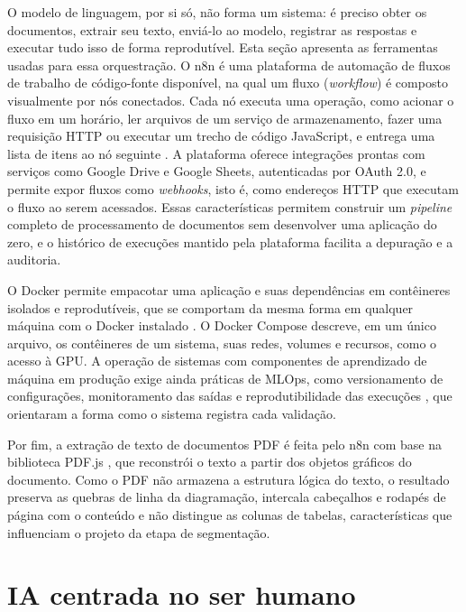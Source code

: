 O modelo de linguagem, por si só, não forma um sistema: é preciso obter os documentos, extrair seu texto, enviá-lo ao modelo, registrar as respostas e executar tudo isso de forma reprodutível. Esta seção apresenta as ferramentas usadas para essa orquestração. O n8n é uma plataforma de automação de fluxos de trabalho de código-fonte disponível, na qual um fluxo (\textit{workflow}) é composto visualmente por nós conectados. Cada nó executa uma operação, como acionar o fluxo em um horário, ler arquivos de um serviço de armazenamento, fazer uma requisição HTTP ou executar um trecho de código JavaScript, e entrega uma lista de itens ao nó seguinte \cite{n8nDocs}. A plataforma oferece integrações prontas com serviços como Google Drive e Google Sheets, autenticadas por OAuth 2.0, e permite expor fluxos como \textit{webhooks}, isto é, como endereços HTTP que executam o fluxo ao serem acessados. Essas características permitem construir um \textit{pipeline} completo de processamento de documentos sem desenvolver uma aplicação do zero, e o histórico de execuções mantido pela plataforma facilita a depuração e a auditoria.

O Docker permite empacotar uma aplicação e suas dependências em contêineres isolados e reprodutíveis, que se comportam da mesma forma em qualquer máquina com o Docker instalado \cite{Merkel2014}. O Docker Compose descreve, em um único arquivo, os contêineres de um sistema, suas redes, volumes e recursos, como o acesso à GPU. A operação de sistemas com componentes de aprendizado de máquina em produção exige ainda práticas de MLOps, como versionamento de configurações, monitoramento das saídas e reprodutibilidade das execuções \cite{Kreuzberger2023}, que orientaram a forma como o sistema registra cada validação.

Por fim, a extração de texto de documentos PDF é feita pelo n8n com base na biblioteca PDF.js \cite{PDFjs}, que reconstrói o texto a partir dos objetos gráficos do documento. Como o PDF não armazena a estrutura lógica do texto, o resultado preserva as quebras de linha da diagramação, intercala cabeçalhos e rodapés de página com o conteúdo e não distingue as colunas de tabelas, características que influenciam o projeto da etapa de segmentação.

\section{IA centrada no ser humano}
\label{sec:humano}

